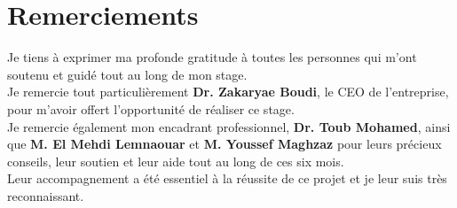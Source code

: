 \chapter*{Remerciements}
Je tiens à exprimer ma profonde gratitude à toutes les personnes qui m'ont soutenu et guidé tout au long de mon stage.\\[1mm] 
Je remercie tout particulièrement \textbf{Dr. Zakaryae Boudi}, le CEO de l'entreprise, pour m'avoir offert l'opportunité de réaliser ce stage.\\[1mm]
Je remercie également mon encadrant professionnel, \textbf{Dr. Toub Mohamed}, ainsi que \textbf{M. El Mehdi Lemnaouar} et \textbf{M. Youssef Maghzaz} pour leurs précieux conseils, leur soutien et leur aide tout au long de ces six mois.\\[1mm]
Leur accompagnement a été essentiel à la réussite de ce projet et je leur suis très reconnaissant.
\newpage